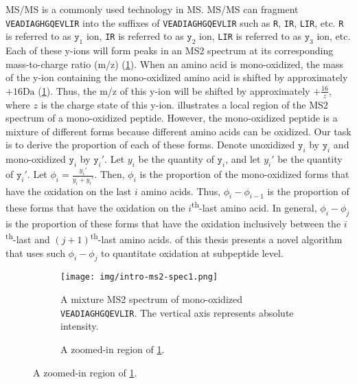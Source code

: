 \Gls{MS/MS} is a commonly used technology in \gls{MS}.
\Gls{MS/MS} can fragment \texttt{VEADIAGHGQEVLIR} into the suffixes of \texttt{VEADIAGHGQEVLIR} such as \texttt{R}, \texttt{IR}, \texttt{LIR}, etc.
\texttt{R} is referred to as \(\texttt{y}_1\) ion, \texttt{IR} is referred to as \(\texttt{y}_2\) ion, \texttt{LIR} is referred to as \(\texttt{y}_3\) ion, etc.
Each of these y-ions will form peaks in an \gls{MS2} spectrum at its corresponding mass-to-charge ratio (\gls{m/z})
		(\cref{fig:intro:unox-vs-oxid-VEADIAGHGQEVLIR}).
When an amino acid is \gls{mono-oxidized}, the mass of the y-ion containing the \gls{mono-oxidized} amino acid is shifted by approximately \(+16\si{\dalton}\) (\cref{fig:intro:unox-vs-oxid-VEADIAGHGQEVLIR}).
Thus, the \gls{m/z} of this y-ion will be shifted by approximately \(+\frac{16}{z}\), where \(z\) is the charge state of this y-ion.
 illustrates a local region of the \gls{MS2} spectrum of a \gls{mono-oxidized} peptide.
However, the \gls{mono-oxidized} peptide is a mixture of different forms because different amino acids can be oxidized.
Our task is to derive the proportion of each of these forms.
Denote unoxidized \(\texttt{y}_i\) by \(\texttt{y}_i\) and \gls{mono-oxidized} \(\texttt{y}_i\) by \(\texttt{y}_i'\).
Let \(y_i\) be the quantity of \(\texttt{y}_i\), and let \(y_i'\) be the quantity of \(\texttt{y}_i'\).
Let \(\phi_i = \frac{y_i'}{y_i+y_i'}\).
Then, \(\phi_i\) is the proportion of the \gls{mono-oxidized} forms that have the oxidation on the last \(i\) amino acids.
Thus, \(\phi_i - \phi_{i-1}\) is the proportion of these forms that have the oxidation on the \(i\)\textsuperscript{th}-last amino acid.
In general, \(\phi_i - \phi_j\) is the proportion of these forms that have the oxidation inclusively between the 
		\(i\)\textsuperscript{th}-last and \((j+1)\)\textsuperscript{th}-last amino acids.
 of this thesis presents a novel algorithm that uses such \(\phi_i - \phi_j\) to quantitate oxidation at subpeptide level.

\begin{figure}
\begin{figure}[H]
\texttt{[image: img/intro-ms2-spec1.png]}
\caption[
	A mixture \gls{MS2} spectrum of \gls{mono-oxidized} \texttt{VEADIAGHGQEVLIR}.]{
	A mixture \gls{MS2} spectrum of \gls{mono-oxidized} \texttt{VEADIAGHGQEVLIR}.
	The vertical axis represents absolute intensity.
\label{fig:intro:unox-vs-oxid-VEADIAGHGQEVLIR}}
\end{figure}
\begin{figure}[H]
\caption[A zoomed-in region of \cref{fig:intro:unox-vs-oxid-VEADIAGHGQEVLIR}.]{
         A zoomed-in region of \cref{fig:intro:unox-vs-oxid-VEADIAGHGQEVLIR}.
\label{fig:intro:zoomed-in-unox-vs-oxid-VEADIAGHGQEVLIR}}
\end{figure}
\end{figure}

